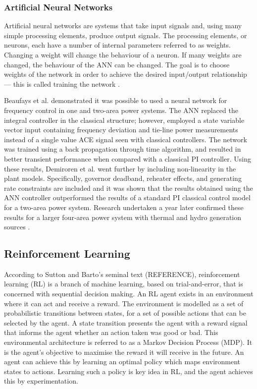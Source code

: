\subsubsection{Artificial Neural Networks}
Artificial neural networks are systems that take input signals and, using many simple processing elements, produce output signals. The processing elements, or neurons, each have a number of internal parameters referred to as weights. Changing a weight will change the behaviour of a neuron. If many weights are changed, the behaviour of the ANN can be changed. The goal is to choose weights of the network in order to achieve the desired input/output relationship --- this is called training the network \cite{Nguyen1990}.

Beaufays et al. \cite{Beaufays1994} demonstrated it was possible to used a neural network for frequency control in one and two-area power systems. The ANN replaced the integral controller in the classical structure; however, employed a state variable vector input containing frequency deviation and tie-line power measurements instead of a single value ACE signal seen with classical controllers. The network was trained using a back propagation through time algorithm, and resulted in better transient performance when compared with a classical PI controller. Using these results, Demiroren et al. \cite{Demiroren2001} went further by including non-linearity in the plant models. Specifically, governor deadband, reheater effects, and generating rate constraints are included and it was shown that the results obtained using the ANN controller outperformed the results of a standard PI classical control model for a two-area power system. Research undertaken a year later confirmed these results for a larger four-area power system with thermal and hydro generation sources \cite{Zeynelgil2002}. 


\subsection{Reinforcement Learning}\label{rl}
According to Sutton and Barto's seminal text (REFERENCE), reinforcement learning (RL) is a branch of machine learning, based on trial-and-error, that is concerned with sequential decision making. An RL agent exists in an environment where it can act and receive a reward. The environment is modelled as a set of probabilistic transitions between states, for a set of possible actions that can be selected by the agent. A state transition presents the agent with a reward signal that informs the agent whether an action taken was good or bad. This environmental architecture is referred to as a Markov Decision Process (MDP). It is the agent's objective to maximise the reward it will receive in the future. An agent can achieve this by learning an optimal policy which maps environment states to actions. Learning such a policy is key idea in RL, and the agent achieves this by experimentation.

